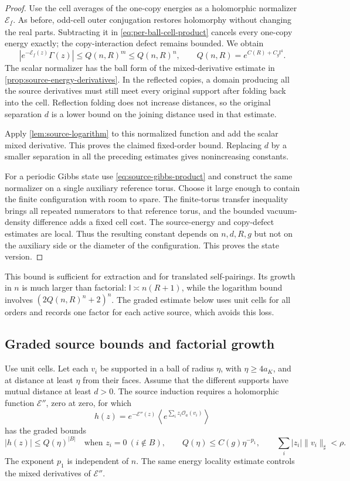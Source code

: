 \documentclass[11pt,letterpaper,reqno]{amsart}
\theoremstyle{definition}
\theoremstyle{remark}
\newcommand{\cO}{\mathcal O}
\begin{document}
\begin{proof}
Use the cell averages of the one-copy energies as a holomorphic
normalizer $\mathcal E_{\underline f}$. As before, odd-cell outer
conjugation restores holomorphy without changing the real parts.
Subtracting it in \eqref{eq:per-ball-cell-product} cancels every
one-copy energy exactly; the copy-interaction defect remains bounded.
We obtain
\[
 |e^{-\mathcal E_{\underline f}(z)}\Gamma(z)|
        \le Q(n,R)^m\le Q(n,R)^n,
 \qquad Q(n,R)=e^{C(R)+C_g\mathsf l^4}.
\]
The scalar normalizer has the ball form of the mixed-derivative
estimate in \cref{prop:source-energy-derivatives}. In the reflected
copies, a domain producing all the source derivatives must still
meet every original support after folding back into the cell.
Reflection folding does not increase distances, so the original
separation $d$ is a lower bound on the joining distance used in
that estimate.

Apply \cref{lem:source-logarithm} to this normalized function and
add the scalar mixed derivative. This proves the claimed fixed-order
bound. Replacing $d$ by a smaller separation in all the preceding
estimates gives nonincreasing constants.

For a periodic Gibbs state use \eqref{eq:source-gibbs-product} and
construct the same normalizer on a single auxiliary reference torus.
Choose it large enough to contain the finite configuration with room
to spare. The finite-torus transfer inequality brings all repeated
numerators to that reference torus, and the bounded vacuum-density
difference adds a fixed cell cost. The source-energy and copy-defect
estimates are local. Thus the resulting constant depends on
$n,d,R,g$ but not on the auxiliary side or the diameter of the
configuration. This proves the state version.
\end{proof}

This bound is sufficient for extraction and for translated
self-pairings. Its growth in $n$ is much larger than factorial:
$\mathsf l\asymp n(R+1)$, while the logarithm bound involves
$(2Q(n,R)^n+2)^n$. The graded estimate below uses unit cells for
all orders and records one factor for each active source, which avoids
this loss.

\subsection{Graded source bounds and factorial growth}

Use unit cells. Let each $v_i$ be supported in a ball of radius $\eta$,
with $\eta\ge4a_K$, and at distance at least $\eta$ from their faces.
Assume that the different supports have mutual distance at least $d>0$.
The source induction requires a holomorphic function $\mathcal E''$,
zero at zero, for which
\[
 h(z)=e^{-\mathcal E''(z)}
                 \left\langle e^{\sum_i z_i\cO_a(v_i)}\right\rangle
\]
has the graded bounds
\begin{equation}\label{eq:graded}
 |h(z)|\le Q(\eta)^{|B|}\quad\text{when }z_i=0\ (i\notin B),
 \qquad Q(\eta)\le C(g)\eta^{-p_1},
 \qquad \sum_i|z_i|\|v_i\|_\sharp<\rho.
\end{equation}
The exponent $p_1$ is independent of $n$. The same energy locality
estimate controls the mixed derivatives of $\mathcal E''$.
\end{document}
